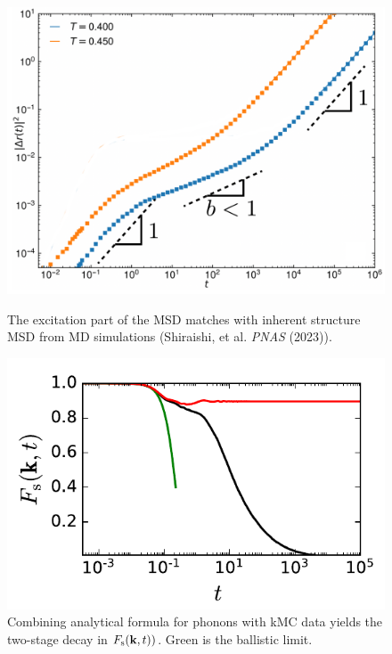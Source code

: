 \begin{frame}
\begin{columns}[T]
\begin{column}[T]{0.5\textwidth}
\begin{figure}
\begin{overprint}
\centering\includegraphics[valign=c,width=0.9\linewidth]{d.6-fac_results_3/ismsdmd.pdf}
\caption{The excitation part of the MSD matches with inherent structure MSD from MD simulations (Shiraishi, et al. \textit{PNAS} (2023)).}

\centering\includegraphics[valign=c,width=0.9\linewidth]{d.6-fac_results_3/newmsdphonons1.pdf}
\caption{Combining analytical formula for phonons with kMC data yields the two-stage decay in $F_\mathrm{s}(\mathbf{k},t))$. Green is the ballistic limit.}



\end{overprint}
\end{figure}


\end{column}
\end{columns}
\end{frame}
